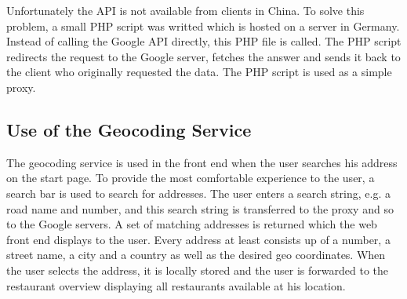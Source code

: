 Unfortunately the API is not available from clients in China. To solve this problem, a small PHP script was writted which is hosted on a server in Germany. Instead of calling the Google API directly, this PHP file is called. The PHP script redirects the request to the Google server, fetches the answer and sends it back to the client who originally requested the data. The PHP script is used as a simple proxy.

\subsection{Use of the Geocoding Service}
The geocoding service is used in the front end when the user searches his address on the start page. To provide the most comfortable experience to the user, a search bar is used to search for addresses. The user enters a search string, e.g. a road name and number, and this search string is transferred to the proxy and so to the Google servers. A set of matching addresses is returned which the web front end displays to the user. Every address at least consists up of a number, a street name, a city and a country as well as the desired geo coordinates. When the user selects the address, it is locally stored and the user is forwarded to the restaurant overview displaying all restaurants available at his location.
